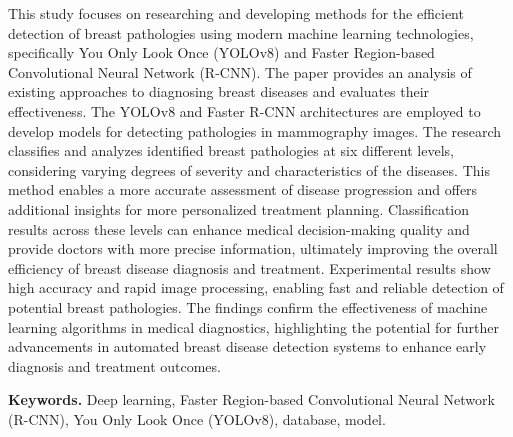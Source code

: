 This study focuses on researching and developing methods for the
efficient detection of breast pathologies using modern machine learning
technologies, specifically You Only Look Once (YOLOv8) and Faster
Region-based Convolutional Neural Network (R-CNN). The paper provides an
analysis of existing approaches to diagnosing breast diseases and
evaluates their effectiveness. The YOLOv8 and Faster R-CNN architectures
are employed to develop models for detecting pathologies in mammography
images. The research classifies and analyzes identified breast
pathologies at six different levels, considering varying degrees of
severity and characteristics of the diseases. This method enables a more
accurate assessment of disease progression and offers additional
insights for more personalized treatment planning. Classification
results across these levels can enhance medical decision-making quality
and provide doctors with more precise information, ultimately improving
the overall efficiency of breast disease diagnosis and treatment.
Experimental results show high accuracy and rapid image processing,
enabling fast and reliable detection of potential breast pathologies.
The findings confirm the effectiveness of machine learning algorithms in
medical diagnostics, highlighting the potential for further advancements
in automated breast disease detection systems to enhance early diagnosis
and treatment outcomes.

{\bfseries Keywords.} Deep learning, Faster Region-based Convolutional
Neural Network (R-CNN), You Only Look Once (YOLOv8), database, model.

